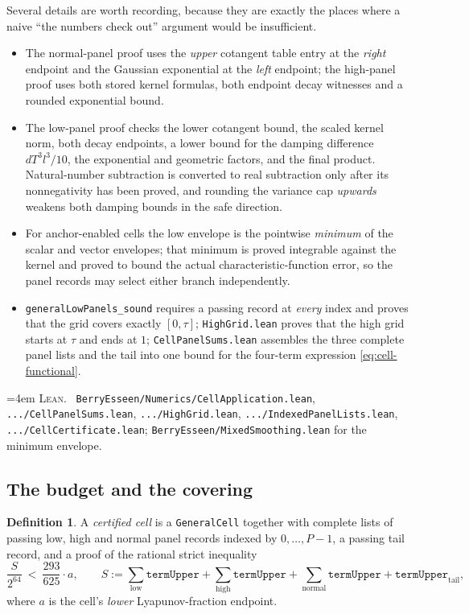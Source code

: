 \documentclass[10pt,a4paper]{article}
\theoremstyle{plain}
\theoremstyle{definition}
\newtheorem{definition}[theorem]{Definition}
\newcommand{\lean}[1]{\texttt{#1}}
\newcommand{\file}[1]{\texttt{#1}}
\newenvironment{leanref}%
  {\par\addvspace{3pt}\begingroup\sloppy\emergencystretch=4em
   \noindent\footnotesize\textsc{Lean.}\ \ignorespaces}%
  {\par\endgroup\addvspace{3pt}}
\begin{document}
Several details are worth recording, because they are exactly the places where a
naive ``the numbers check out'' argument would be insufficient.
\begin{itemize}[leftmargin=2.2em]
\item The normal-panel proof uses the \emph{upper} cotangent table entry at the
  \emph{right} endpoint and the Gaussian exponential at the \emph{left}
  endpoint; the high-panel proof uses both stored kernel formulas, both
  endpoint decay witnesses and a rounded exponential bound.
\item The low-panel proof checks the lower cotangent bound, the scaled kernel
  norm, both decay endpoints, a lower bound for the damping difference
  $dT^3l^3/10$, the exponential and geometric factors, and the final product.
  Natural-number subtraction is converted to real subtraction only after its
  nonnegativity has been proved, and rounding the variance cap \emph{upwards}
  weakens both damping bounds in the safe direction.
\item For anchor-enabled cells the low envelope is the pointwise \emph{minimum}
  of the scalar and vector envelopes; that minimum is proved integrable against
  the kernel and proved to bound the actual characteristic-function error, so
  the panel records may select either branch independently.
\item \lean{generalLowPanels\_sound} requires a passing record at \emph{every}
  index and proves that the grid covers exactly $[0,\tau]$;
  \lean{HighGrid.lean} proves that the high grid starts at $\tau$ and ends at
  $1$; \lean{CellPanelSums.lean} assembles the three complete panel lists and
  the tail into one bound for the four-term expression
  \eqref{eq:cell-functional}.
\end{itemize}

\begin{leanref}
\file{BerryEsseen/Numerics/CellApplication.lean},
\file{.../CellPanelSums.lean}, \file{.../HighGrid.lean},
\file{.../IndexedPanelLists.lean}, \file{.../CellCertificate.lean};
\file{BerryEsseen/MixedSmoothing.lean} for the minimum envelope.
\end{leanref}

\subsection{The budget and the covering}

\begin{definition}\label{def:certified-cell}
A \emph{certified cell} is a \lean{GeneralCell} together with complete lists of
passing low, high and normal panel records indexed by $0,\dots,P-1$, a passing
tail record, and a proof of the rational strict inequality
\begin{equation}\label{eq:cell-budget}
  \frac{S}{2^{64}} \ <\ \frac{293}{625}\cdot a,
  \qquad
  S := \sum_{\text{low}}\lean{termUpper}+\sum_{\text{high}}\lean{termUpper}
       +\sum_{\text{normal}}\lean{termUpper}+\lean{termUpper}_{\text{tail}} ,
\end{equation}
where $a$ is the cell's \emph{lower} Lyapunov-fraction endpoint.
\end{definition}
\end{document}
